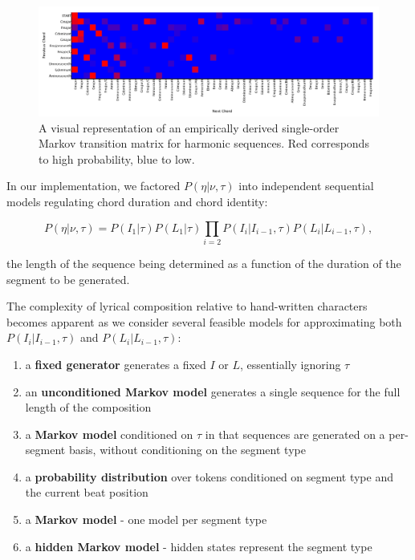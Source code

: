 \documentclass[letterpaper]{article}
\begin{document}
\begin{figure}[ht]
	\centering
	\includegraphics[width=\linewidth]{harmony}
	\caption{\label{fig:harmony} A visual representation of an empirically derived single-order Markov transition matrix for harmonic sequences. Red corresponds to high probability, blue to low.}
\end{figure}

In our implementation, we factored $P(\eta|\nu,\tau)$ into independent sequential models regulating chord duration and chord identity:

\[ P(\eta|\nu,\tau) = P(I_1|\tau) P(L_1|\tau) \prod_{i=2} P(I_i|I_{i-1},\tau) P(L_i | L_{i-1},\tau), \]

\noindent the length of the sequence being determined as a function of the duration of the segment to be generated.

The complexity of lyrical composition relative to hand-written characters becomes apparent as we consider several feasible models for approximating both $P(I_i|I_{i-1},\tau)$ and $P(L_i | L_{i-1},\tau)$:

\begin{enumerate}
\item a \textbf{fixed generator} generates a fixed $I$ or $L$, essentially ignoring $\tau$
\item an \textbf{unconditioned Markov model} generates a single sequence for the full length of the composition
\item a \textbf{Markov model} conditioned on $\tau$ in that sequences are generated on a per-segment basis, without conditioning on the segment type
\item \label{model:distribution_model}a \textbf{probability distribution} over tokens conditioned on segment type and the current beat position
\item \label{model:seg_model}a \textbf{Markov model} - one model per segment type
\item a \textbf{hidden Markov model} - hidden states represent the segment type
\end{enumerate}
\end{document}
